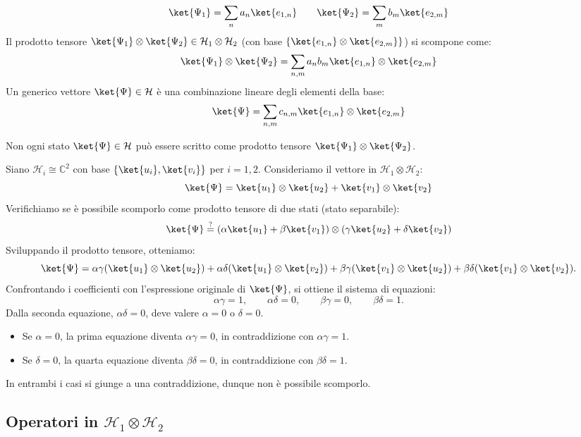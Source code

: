 \[
    \ket{\Psi_1} = \sum_{n} a_n \ket{e_{1,n}} \qquad \ket{\Psi_2} = \sum_{m} b_m \ket{e_{2,m}}
\]
Il prodotto tensore \(\ket{\Psi_1} \otimes \ket{\Psi_2} \in \mathcal{H}_1 \otimes \mathcal{H}_2\) (con base \(\{\ket{e_{1,n}} \otimes \ket{e_{2,m}}\}\)) si scompone come:
\[
    \ket{\Psi_1} \otimes \ket{\Psi_2} = \sum_{n,m} a_n b_m \ket{e_{1,n}} \otimes \ket{e_{2,m}}
\]
Un generico vettore \(\ket{\Psi} \in \mathcal{H}\) è una combinazione lineare degli elementi della base:
\[
    \ket{\Psi} = \sum_{n,m} c_{n,m} \ket{e_{1,n}} \otimes \ket{e_{2,m}}
\]
\begin{attention}
    Non ogni stato \(\ket{\Psi} \in \mathcal{H}\) può essere scritto come prodotto tensore \(\ket{\Psi_1} \otimes \ket{\Psi_2}\).
\end{attention}

\begin{example}
    Siano \(\mathcal{H}_i \cong \mathbb{C}^2\) con base \(\{\ket{u_i}, \ket{v_i}\}\) per \(i=1,2\).
    Consideriamo il vettore in \(\mathcal{H}_1 \otimes \mathcal{H}_2\):
    \[
        \ket{\Psi} = \ket{u_1}\otimes\ket{u_2} + \ket{v_1}\otimes\ket{v_2}
    \]
    Verifichiamo se è possibile scomporlo come prodotto tensore di due stati (stato separabile):
    \[
        \ket{\Psi} \overset{?}{=} (\alpha\ket{u_1} + \beta\ket{v_1}) \otimes (\gamma\ket{u_2} + \delta\ket{v_2})
    \]
    Sviluppando il prodotto tensore, otteniamo:
    \[
        \ket{\Psi} = \alpha\gamma (\ket{u_1}\otimes\ket{u_2}) + \alpha\delta (\ket{u_1}\otimes\ket{v_2}) + \beta\gamma (\ket{v_1}\otimes\ket{u_2}) + \beta\delta (\ket{v_1}\otimes\ket{v_2}).
    \]
    Confrontando i coefficienti con l'espressione originale di \(\ket{\Psi}\), si ottiene il sistema di equazioni:
    \[
        \alpha\gamma = 1, \qquad \alpha\delta = 0, \qquad \beta\gamma = 0, \qquad \beta\delta = 1.
    \]
    Dalla seconda equazione, \(\alpha\delta = 0\), deve valere \(\alpha=0\) o \(\delta=0\).
    \begin{itemize}
        \item Se \(\alpha=0\), la prima equazione diventa \(\alpha\gamma = 0\), in contraddizione con \(\alpha\gamma = 1\).
        \item Se \(\delta=0\), la quarta equazione diventa \(\beta\delta = 0\), in contraddizione con \(\beta\delta = 1\).
    \end{itemize}
    In entrambi i casi si giunge a una contraddizione, dunque non è possibile scomporlo. 
\end{example}


\subsection{Operatori in \texorpdfstring{\(\mathcal{H}_1\otimes\mathcal{H}_2\)}{H1⊗H2}}

